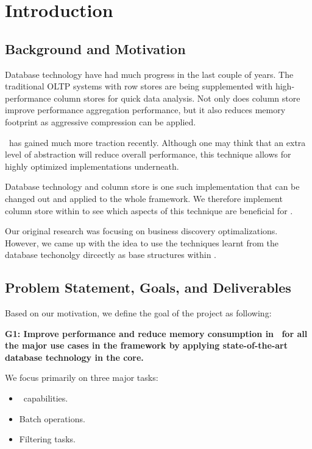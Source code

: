 \chapter{Introduction}
\label{chap:introduction}

\section{Background and Motivation}
\label{sec:Background and Motivation}
Database technology have had much progress in the last couple of years. The traditional OLTP systems with row stores are being supplemented with high-performance column stores for quick data analysis. Not only does column store improve performance aggregation performance, but it also reduces memory footprint as aggressive compression can be applied.

\mdd~has gained much more traction recently. Although one may think that an extra level of abstraction will reduce overall performance, this technique allows for highly optimized implementations underneath. 

Database technology and column store is one such implementation that can be changed out and applied to the whole framework. We therefore implement column store within \genusSoftware to see which aspects of this technique are beneficial for \mdd.


Our original research was focusing on business discovery optimalizations. However, we came up with the idea to use the techniques learnt from the database techonolgy dircectly as base structures within \genusSoftware.

\section{Problem Statement, Goals, and Deliverables}
\label{sec:Problem Statement, Goals, and Deliverables}
Based on our motivation, we define the goal of the project as following: 

\textbf{G1: Improve performance and reduce memory consumption in \genusSoftware~for all the major use cases in the framework by applying state-of-the-art database technology in the core.}

We focus primarily on three major tasks:
\begin{itemize}
    \item \bd~capabilities.
    \item Batch operations.
    \item Filtering tasks.
\end{itemize}

